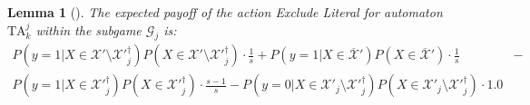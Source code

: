 \documentclass[11pt,a4paper]{article}
\newcommand{\True}{\mbox{1}}
\newcommand{\False}{\mbox{0}}
\newtheorem{mylemma}{Lemma}
\begin{document}
\begin{mylemma}[]\label{lemma:exclude_literal}
The expected payoff of the action \emph{Exclude Literal} for automaton $\mathrm{TA}^j_k$ within the subgame $\mathcal{G}_j$ is:
\begin{eqnarray}
P(y = \True | X \in \mathcal{X}' \setminus \mathcal{X}'^\dagger_j) P(X \in \mathcal{X}' \setminus \mathcal{X}'^\dagger_j) \cdot \frac{1}{s} + P(y = \True | X \in \overline{\mathcal{X}}') P(X \in \overline{\mathcal{X}}') \cdot \frac{1}{s}
&-&\nonumber\\
P(y = \True | X \in \mathcal{X}'^{\dagger}_j)P(X \in \mathcal{X}'^{\dagger}_j) \cdot \frac{s-1}{s} - 
P(y = \False | X \in \mathcal{X}'_j \setminus \mathcal{X}'^\dagger_j) P(X \in \mathcal{X}'_j \setminus \mathcal{X}'^\dagger_j) \cdot 1.0 \label{eqn:exclude_literal_expected}
\end{eqnarray}
\end{mylemma}
\end{document}
